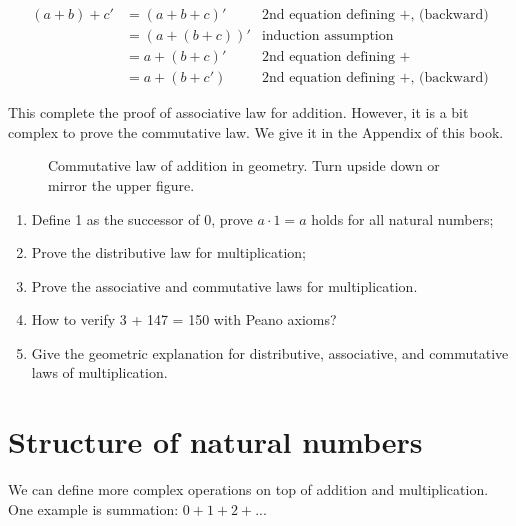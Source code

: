 \documentclass[UTF8]{article}
\begin{document}
\[
\begin{array}{rlr}
(a + b) + c' & = (a + b + c)' & \text{2nd equation defining +, (backward)} \\
             & = (a + (b + c))' & \text{induction assumption} \\
             & = a + (b + c)' & \text{2nd equation defining +} \\
             & = a + (b + c') & \text{2nd equation defining +, (backward)}
\end{array}
\]

This complete the proof of associative law for addition. However, it is a bit complex to prove the commutative law. We give it in the Appendix of this book.

\begin{figure}[htbp]
\centering
{}
\caption{Commutative law of addition in geometry. Turn upside down or mirror the upper figure.}
\end{figure}

\begin{Exercise}
\begin{enumerate}
\item Define 1 as the successor of 0, prove $a \cdot 1 = a$ holds for all natural numbers;
\item Prove the distributive law for multiplication;
\item Prove the associative and commutative laws for multiplication.
\item How to verify 3 + 147 = 150 with Peano axioms?
\item Give the geometric explanation for distributive, associative, and commutative laws of multiplication.
\end{enumerate}
\end{Exercise}

\section{Structure of natural numbers}

We can define more complex operations on top of addition and multiplication. One example is summation: $0 + 1 + 2 + ... $
\end{document}
